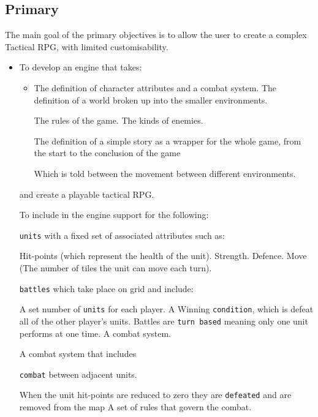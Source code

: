 \subsection{Primary}
\label{primary}
The main goal of the primary objectives is to allow the user to create a complex Tactical RPG, with limited customisability.  
\begin{itemize}
\item To develop an engine that takes:
\begin{itemize}

 	\item The definition of character attributes and a combat system.
	\tick The definition of a world broken up into the smaller environments.
	\begin{itemize}
		\tick The rules of the game.
		\tick The kinds of enemies.
	\end{itemize}
	
	\tick The definition of a simple story as a wrapper for the whole game, from the start to the conclusion of the game
	\begin{itemize}
		\tick Which is told between the movement between different environments.
	\end{itemize}
	                        
\end{itemize}
and create a playable tactical RPG.

\tick To include in the engine support for the following:

\begin{itemize}
	\tick \texttt{units} with a fixed set of associated attributes such as:
	\begin{itemize}
		\tick Hit-points (which represent the health of the unit).
		\tick Strength.
		\tick Defence.
		\tick Move (The number of tiles the unit can move each turn).
	\end{itemize}
	
	\tick \texttt{battles} which take place on grid and include:
	\begin{itemize}
		\tick  A set number of \texttt{units} for each player.
		\tick  A Winning \texttt{condition}, which is defeat all of the other player's units.
		\tick  Battles are \texttt{turn based} meaning only one unit performs at one time.   
		\tick  A combat system.
	\end{itemize}
	
	\tick A combat system that includes
		\begin{itemize}
			\tick \texttt{combat} between adjacent units.
			\begin{itemize}
				\tick When the unit hit-points are reduced to zero they are \texttt{defeated} and are removed from the map
			\tick A set of rules that govern the combat.
			\end{itemize}
			

\end{itemize}
\end{itemize}
\end{itemize}
